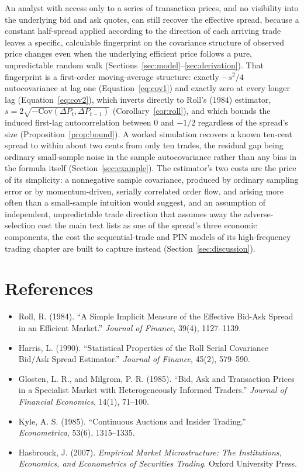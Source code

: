 \documentclass[11pt]{article}
\theoremstyle{remark}
\theoremstyle{definition}
\begin{document}
An analyst with access only to a series of transaction prices, and no visibility into the underlying bid and ask quotes, can still recover the effective spread, because a constant half-spread applied according to the direction of each arriving trade leaves a specific, calculable fingerprint on the covariance structure of observed price changes even when the underlying efficient price follows a pure, unpredictable random walk (Sections~\ref{sec:model}--\ref{sec:derivation}). That fingerprint is a first-order moving-average structure: exactly $-s^2/4$ autocovariance at lag one (Equation~\eqref{eq:cov1}) and exactly zero at every longer lag (Equation~\eqref{eq:cov2}), which inverts directly to Roll's (1984) estimator, $s = 2\sqrt{-\mathrm{Cov}(\Delta P_t,\Delta P_{t-1})}$ (Corollary~\ref{cor:roll}), and which bounds the induced first-lag autocorrelation between $0$ and $-1/2$ regardless of the spread's size (Proposition~\ref{prop:bound}). A worked simulation recovers a known ten-cent spread to within about two cents from only ten trades, the residual gap being ordinary small-sample noise in the sample autocovariance rather than any bias in the formula itself (Section~\ref{sec:example}). The estimator's two costs are the price of its simplicity: a nonnegative sample covariance, produced by ordinary sampling error or by momentum-driven, serially correlated order flow, and arising more often than a small-sample intuition would suggest, and an assumption of independent, unpredictable trade direction that assumes away the adverse-selection cost the main text lists as one of the spread's three economic components, the cost the sequential-trade and PIN models of its high-frequency trading chapter are built to capture instead (Section~\ref{sec:discussion}).

\section*{References}
\begin{itemize}
\item Roll, R. (1984). ``A Simple Implicit Measure of the Effective Bid-Ask Spread in an Efficient Market.'' \textit{Journal of Finance}, 39(4), 1127--1139.
\item Harris, L. (1990). ``Statistical Properties of the Roll Serial Covariance Bid/Ask Spread Estimator.'' \textit{Journal of Finance}, 45(2), 579--590.
\item Glosten, L. R., and Milgrom, P. R. (1985). ``Bid, Ask and Transaction Prices in a Specialist Market with Heterogeneously Informed Traders.'' \textit{Journal of Financial Economics}, 14(1), 71--100.
\item Kyle, A. S. (1985). ``Continuous Auctions and Insider Trading.'' \textit{Econometrica}, 53(6), 1315--1335.
\item Hasbrouck, J. (2007). \textit{Empirical Market Microstructure: The Institutions, Economics, and Econometrics of Securities Trading}. Oxford University Press.
\end{itemize}
\end{document}
